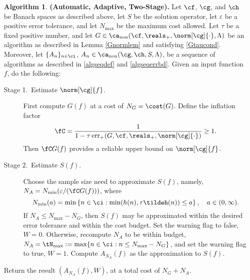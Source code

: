 \documentclass[final]{elsarticle}
\DeclareMathOperator{\err}{err}
\theoremstyle{definition}
\newtheorem{algo}{Algorithm}
\theoremstyle{remark}
\DeclareMathOperator{\fix}{non}
\begin{document}
\begin{algo} \label{twostagedetalgo} {\bf (Automatic, Adaptive, Two-Stage).} Let $\cf$, $\cg$, and $\ch$ be Banach spaces as described above, let $S$ be the solution operator, let $\varepsilon$ be a positive error tolerance, and let $N_{\max}$ be the maximum cost allowed.  Let $\tau$ be a fixed positive number, and let $G \in \ca_{\fix}(\cf,\reals_+,\norm[\cg]{\cdot},\Lambda)$ be an algorithm as described in Lemma \ref{Gnormlem} and satisfying  \eqref{Gtaucond}.
Moreover, let  $\{A_n\}_{n \in \ci}$, $A_n  \in \ca_{\fix}(\cg,\ch,S,\Lambda)$, be a sequence of algorithms as described in  \eqref{algseqdef} and \eqref{algseqerrbd}.  Given an input function $f$, do the following:

\begin{description} 

\item[Stage 1.\ Estimate {$\norm[\cg]{f}$}.] First compute $G(f)$ at a cost of $N_{G} = \cost(G)$.   Define the inflation factor 
\begin{equation}\label{norminflate}
\fC =\frac{1}{1 - \tau \err_{+}(G,\cf,\reals_+,\norm[\cg]{\cdot})} \ge 1.
\end{equation}
Then $\fC G(f)$ provides a reliable upper bound on $\norm[\cg]{f}$.  

\item [Stage 2.\ Estimate {$S(f)$}.] Choose the sample size need to approximate $S(f)$, namely, $N_A=N_{\text{min}}(\varepsilon/(\fC G(f)))$, where 
\begin{equation} \label{Nmindef}
N_{\text{min}}(a)= \min\left\{ n \in \ci : \min(h(n),\tau \tildeh(n)) \le a \right\}, \quad a \in (0,\infty).
\end{equation}
If $N_A \le N_{\max}-N_G$, then $S(f)$ may be approximated within the desired error tolerance and within the cost budget.  Set the warning flag to false, $W=0$. Otherwise, recompute $N_A$ to be within budget, $N_A = \tN_{\max} := \max\{n \in \ci : n\le N_{\max} -  N_G\}$, and set the warning flag to true, $W=1$.  Compute $A_{N_A}(f)$ as the approximation to $S(f)$.
\end{description}

Return the result $(A_{N_A}(f),W)$, at a total cost of $N_G+N_A$.  
\end{algo}
\end{document}
